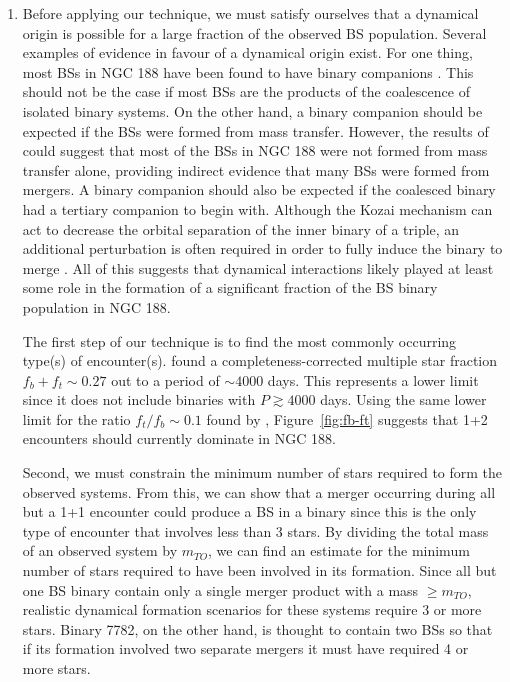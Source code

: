 \begin{enumerate}

\item Before applying our technique, we must satisfy ourselves
  that a dynamical origin is possible for a large fraction of the
  observed BS population.  
  Several examples of evidence in favour of a dynamical origin exist.
  For one thing, most BSs in NGC 188 have been
  found to have binary companions \citep{mathieu09}.  This should not
  be the case if most BSs are the products of the coalescence of
  isolated binary systems.  On the other hand, a binary companion
  should be expected if the BSs were formed from mass transfer.  However,
  the results of \citet{chen08b} could suggest that most of the BSs in
  NGC 188 were not formed from mass transfer alone, providing indirect
  evidence that many BSs were formed from mergers.  A binary companion
  should also be expected if the coalesced binary had a tertiary 
  companion to begin with.  Although the Kozai mechanism can act to decrease the
  orbital separation of the inner binary of a triple, an additional
  perturbation is often required in order to fully induce the binary
  to merge \citep{perets09}.  All of this suggests that
  dynamical interactions likely played at least some role in the formation
  of a significant fraction of the BS binary population in NGC 188.

The first step of our technique is to find the
most commonly occurring type(s) of encounter(s).  \citet{geller08}
found a completeness-corrected multiple star fraction $f_b + f_t
\sim 0.27$ out to a period of $\sim 4000$ days.  This represents a
lower limit since it does not include binaries with $P \gtrsim 4000$
days.  Using the same lower limit for the ratio
$f_t/f_b \sim 0.1$ found by \citet{latham05}, Figure~\ref{fig:fb-ft}
suggests that 1+2 encounters should currently dominate in NGC 188.

Second, we must constrain the minimum number of stars required to form
the observed systems.  
From this, we can show that a merger occurring during all but a 1+1
encounter could produce a BS in a binary since this is the only type
of encounter that involves less than 3 stars.  By dividing the total
mass of an observed 
system by $m_{TO}$, we can find an estimate for the minimum number of
stars required to have been involved in its formation.  Since all but
one BS binary contain only a single merger product with a mass $\ge
m_{TO}$, realistic dynamical formation scenarios for these systems 
require 3 or more stars.  Binary 7782, on the other hand, is thought
to contain two BSs so that if its formation involved two separate
mergers it must have required 4 or more stars.


\end{enumerate}
